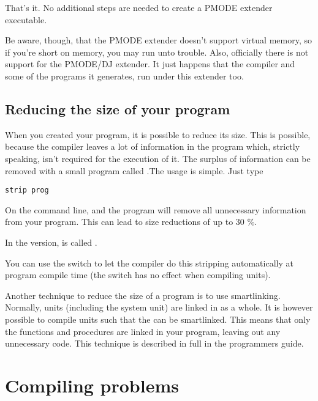 That's it. No additional steps are needed to create a PMODE extender
executable.

Be aware, though, that the PMODE extender doesn't support virtual memory, so
if you're short on memory, you may run unto trouble. Also, officially there
is not support for the PMODE/DJ extender. It just happens that the compiler
and some of the programs it generates, run under this extender too.


\section{Reducing the size of your program}

When you created your program, it is possible to reduce its size. This
is possible, because the compiler leaves a lot of information in the
program which, strictly speaking, isn't required for the execution of
it. The surplus of information can be removed with a small program
called .The usage is simple. Just type
\begin{verbatim}
strip prog
\end{verbatim}
On the command line, and the  program will remove all unnecessary
information from your program. This can lead to size reductions of up to
30 \%.

\begin{remark}
In the \win version,  is called .
\end{remark}
You can use the  switch to let the compiler do this stripping
automatically at program compile time (the switch has no effect when
compiling units).

Another technique to reduce the size of a program is to use smartlinking.
Normally, units (including the system unit) are linked in as a whole.
It is however possible to compile units such that the can be smartlinked.
This means that only the functions and procedures are linked in your
program, leaving out any unnecessary code. This technique is described in
full in the programmers guide.

\chapter{Compiling problems}


